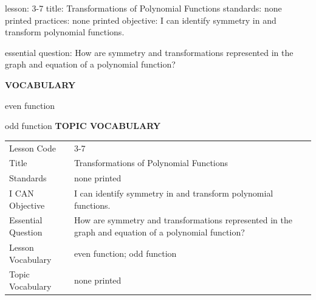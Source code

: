 \documentclass{article}
\newenvironment{lesson-meta}{}{}        %
\newcommand{\te}[1]{}                   %
\begin{document}
\begin{lesson-meta}
lesson: 3-7
title: Transformations of Polynomial Functions
standards: none printed
practices: none printed
objective: I can identify symmetry in and transform polynomial functions.

essential question: How are symmetry and transformations represented in the graph and equation of a polynomial function?

\textbf{VOCABULARY}
\item even function
\item odd function
\textbf{TOPIC VOCABULARY}
\te{No topic vocabulary list is printed on these pages.}
\begin{tabular}{ll}
Lesson Code & 3-7 \\
Title & Transformations of Polynomial Functions \\
Standards & none printed \\
I CAN Objective & I can identify symmetry in and transform polynomial functions. \\
Essential Question & How are symmetry and transformations represented in the graph and equation of a polynomial function? \\
Lesson Vocabulary & even function; odd function \\
Topic Vocabulary & none printed \\
\end{tabular}
\end{lesson-meta}
\end{document}
